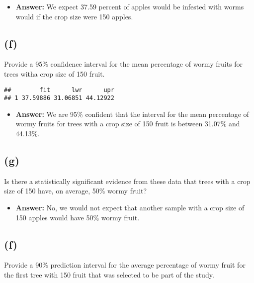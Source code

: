 \documentclass[]{article}
\newenvironment{Shaded}{\begin{snugshade}}{\end{snugshade}}
\newcommand{\OperatorTok}[1]{\textcolor[rgb]{0.81,0.36,0.00}{\textbf{#1}}}
\newcommand{\NormalTok}[1]{#1}
\providecommand{\tightlist}{%
  \setlength{\itemsep}{0pt}\setlength{\parskip}{0pt}}
\begin{document}
\begin{itemize}
\tightlist
\item
  \textbf{Answer:} We expect 37.59 percent of apples would be infested
  with worms would if the crop size were 150 apples.
\end{itemize}

\subsection{(f)}\label{f-1}

Provide a 95\% confidence interval for the mean percentage of wormy
fruits for trees witha crop size of 150 fruit.

\begin{Shaded}
\end{Shaded}

\begin{verbatim}
##        fit      lwr      upr
## 1 37.59886 31.06851 44.12922
\end{verbatim}

\begin{itemize}
\tightlist
\item
  \textbf{Answer:} We are 95\% confident that the interval for the mean
  percentage of wormy fruits for trees with a crop size of 150 fruit is
  between 31.07\% and 44.13\%.
\end{itemize}

\subsection{(g)}\label{g}

Is there a statistically significant evidence from these data that trees
with a crop size of 150 have, on average, 50\% wormy fruit?

\begin{itemize}
\tightlist
\item
  \textbf{Answer:} No, we would not expect that another sample with a
  crop size of 150 apples would have 50\% wormy fruit.
\end{itemize}

\subsection{(f)}\label{f-2}

Provide a 90\% prediction interval for the average percentage of wormy
fruit for the first tree with 150 fruit that was selected to be part of
the study.
\end{document}
